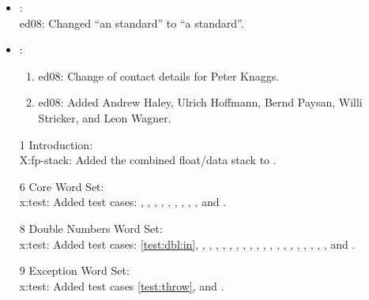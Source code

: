 	\begin{itemize}
	\item {}: \\
		\textsf{ed08}: Changed ``an standard'' to ``a standard''.

	\item {}:
		\begin{enumerate}
		\item \textsf{ed08}: Change of contact details for Peter Knaggs.
		\item \textsf{ed08}: Added Andrew Haley, Ulrich Hoffmann,
			Bernd Paysan, Willi Stricker, and Leon Wagner.
		\end{enumerate}

	\item[1] Introduction: \\
		\textsf{X:fp-stack}: Added the combined float/data
			stack to .

	\item[6] Core Word Set: \\
		\textsf{x:test}: Added test cases:
			,
			,
			,
			,
			,
			,
			,
			,
			,
			 and
			.

	\item[8] Double Numbers Word Set: \\
		\textsf{x:test}: Added test cases:
		\ref{test:dbl:in},
		, 
		, \linebreak
		,
		,
		,
		,
		,
		,
		,
		,
		,
		,
		,
		,
		,
		, \linebreak
		,
		,
		,
		 and
		.

	\item[9] Exception Word Set: \\
		\textsf{x:test}: Added test cases
		\ref{test:throw},
		 and
		.


\end{itemize}
